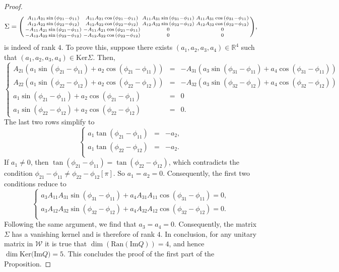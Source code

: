 \documentclass[a4paper, notitlepage, 11pt]{article}
\numberwithin{equation}{section}
\newcommand{\Ker}{{\mathrm{Ker}}}
\newcommand{\R}{\mathbb{R}}
\renewcommand{\Im}[1]{\mathrm{Im}#1}
\newcommand{\Ran}[1]{\mathrm{Ran}\left(#1\right)}
\begin{document}
\begin{proof}
\[
\Sigma = \begin{psmallmatrix}
A_{11}A_{21}\sin{(\phi_{21}-\phi_{11})}&A_{11}A_{21}\cos{(\phi_{21}-\phi_{11})}&A_{11}A_{31}\sin{(\phi_{31}-\phi_{11})}&A_{11}A_{31}\cos{(\phi_{31}-\phi_{11})}\\
A_{12}A_{22}\sin{(\phi_{22}-\phi_{12})}&A_{12}A_{22}\cos{(\phi_{22}-\phi_{12})}&A_{12}A_{32}\sin{(\phi_{32}-\phi_{12})}&A_{12}A_{32}\cos{(\phi_{32}-\phi_{12})}\\
-A_{11}A_{21}\sin{(\phi_{21}-\phi_{11})}&-A_{11}A_{21}\cos{(\phi_{21}-\phi_{11})}&0&0\\
-A_{12}A_{22}\sin{(\phi_{22}-\phi_{12})}&-A_{12}A_{22}\cos{(\phi_{22}-\phi_{12})}&0&0
\end{psmallmatrix},
\]
is indeed of rank $4$. To prove this, suppose there exists $(a_1,a_2,a_3,a_4)\in\R^{4}$ such that $(a_1,a_2,a_3,a_4)\in\Ker{\Sigma}$. Then, 
\[
\left\{\begin{array}{rcl}
A_{21}(a_1\sin{(\phi_{21}-\phi_{11})}+a_2\cos{(\phi_{21}-\phi_{11})})&=&-A_{31}(a_3\sin{(\phi_{31}-\phi_{11})}+a_4\cos{(\phi_{31}-\phi_{11})})\\
A_{22}(a_1\sin{(\phi_{22}-\phi_{12})}+a_2\cos{(\phi_{22}-\phi_{12})})&=& -A_{32}(a_3\sin{(\phi_{32}-\phi_{12})}+a_4\cos{(\phi_{32}-\phi_{12})})\\
a_1\sin{(\phi_{21}-\phi_{11})}+a_2\cos{(\phi_{21}-\phi_{11})} &=& 0\\
a_1\sin{(\phi_{22}-\phi_{12})}+a_2\cos{(\phi_{22}-\phi_{12})}&=&0.
\end{array}\right. 
\]
The last two rows simplify to
\[
\left\{\begin{array}{rcl}
a_1\tan{(\phi_{21}-\phi_{11})}&=& -a_2,\\
a_1\tan{(\phi_{22}-\phi_{12})}&=& -a_2.\\
\end{array}\right. 
\]
If $a_1\neq 0$, then $\tan{(\phi_{21}-\phi_{11})}=\tan{(\phi_{22}-\phi_{12})}$, which contradicts the condition $\phi_{21}-\phi_{11} \neq \phi_{22}-\phi_{12} [\pi]$. So $a_1=a_2=0$.
Consequently, the first two conditions reduce to
\[
\left\{\begin{array}{rcl}
a_3A_{11}A_{31}\sin{(\phi_{31}-\phi_{11})}+a_4A_{31}A_{11}\cos{(\phi_{31}-\phi_{11})}=0,\\
a_3A_{12}A_{32}\sin{(\phi_{32}-\phi_{12})}+a_4A_{32}A_{12}\cos{(\phi_{32}-\phi_{12})}=0.\\
\end{array}\right. 
\]
Following the same argument, we find that $a_3=a_4=0$.  
Consequently, the matrix $\Sigma$ has a vanishing kernel and is therefore of rank $4$. 
In conclusion, for any unitary matrix in $\mathcal W$ it is true that $\dim{(\Ran{\Im{Q}})}= 4$, and hence $\dim{\Ker{(\Im{Q}})}=5$. This concludes the proof of the first part of the Proposition.


\end{proof}
\end{document}
